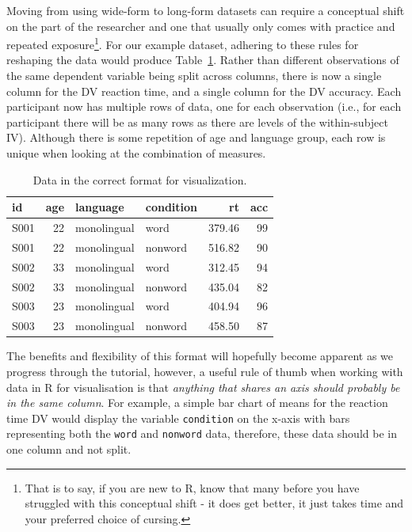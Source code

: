 \documentclass[
  english,
  doc,floatsintext]{apa6}
\begin{document}
Moving from using wide-form to long-form datasets can require a conceptual shift on the part of the researcher and one that usually only comes with practice and repeated exposure\footnote{That is to say, if you are new to R, know that many before you have struggled with this conceptual shift - it does get better, it just takes time and your preferred choice of cursing.}. For our example dataset, adhering to these rules for reshaping the data would produce Table~\ref{tab:long}. Rather than different observations of the same dependent variable being split across columns, there is now a single column for the DV reaction time, and a single column for the DV accuracy. Each participant now has multiple rows of data, one for each observation (i.e., for each participant there will be as many rows as there are levels of the within-subject IV). Although there is some repetition of age and language group, each row is unique when looking at the combination of measures.

\begin{table}

\caption{\label{tab:long}Data in the correct format for visualization.}
\centering
\begin{tabular}[t]{l|r|l|l|r|r}
\hline
id & age & language & condition & rt & acc\\
\hline
S001 & 22 & monolingual & word & 379.46 & 99\\
\hline
S001 & 22 & monolingual & nonword & 516.82 & 90\\
\hline
S002 & 33 & monolingual & word & 312.45 & 94\\
\hline
S002 & 33 & monolingual & nonword & 435.04 & 82\\
\hline
S003 & 23 & monolingual & word & 404.94 & 96\\
\hline
S003 & 23 & monolingual & nonword & 458.50 & 87\\
\hline
\end{tabular}
\end{table}

The benefits and flexibility of this format will hopefully become apparent as we progress through the tutorial, however, a useful rule of thumb when working with data in R for visualisation is that \emph{anything that shares an axis should probably be in the same column}. For example, a simple bar chart of means for the reaction time DV would display the variable \texttt{condition} on the x-axis with bars representing both the \texttt{word} and \texttt{nonword} data, therefore, these data should be in one column and not split.
\end{document}
